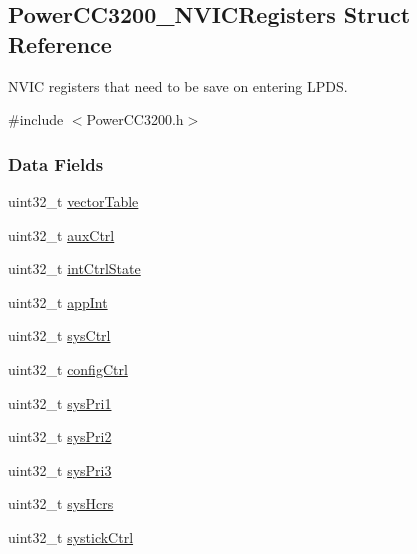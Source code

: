 \subsection{Power\+C\+C3200\+\_\+\+N\+V\+I\+C\+Registers Struct Reference}
\label{struct_power_c_c3200___n_v_i_c_registers}


N\+V\+I\+C registers that need to be save on entering L\+P\+D\+S.  




{\ttfamily \#include $<$Power\+C\+C3200.\+h$>$}

\subsubsection*{Data Fields}
\begin{DoxyCompactItemize}
\item 
uint32\+\_\+t \hyperlink{struct_power_c_c3200___n_v_i_c_registers_a74fc1ecc344c0abca6ec895aae4950c2}{vector\+Table}
\item 
uint32\+\_\+t \hyperlink{struct_power_c_c3200___n_v_i_c_registers_ae496eff43873c94c5848b60affc4053c}{aux\+Ctrl}
\item 
uint32\+\_\+t \hyperlink{struct_power_c_c3200___n_v_i_c_registers_a934e142bb77cb368d3d1a6a85042aac2}{int\+Ctrl\+State}
\item 
uint32\+\_\+t \hyperlink{struct_power_c_c3200___n_v_i_c_registers_aaecf0147c3607a13b31d579ebde8d77c}{app\+Int}
\item 
uint32\+\_\+t \hyperlink{struct_power_c_c3200___n_v_i_c_registers_a7c56160a6a6874fe751a49cf3d699d6b}{sys\+Ctrl}
\item 
uint32\+\_\+t \hyperlink{struct_power_c_c3200___n_v_i_c_registers_af46d1a1ebd426a59c633cecc37b3f255}{config\+Ctrl}
\item 
uint32\+\_\+t \hyperlink{struct_power_c_c3200___n_v_i_c_registers_a66def31675e8a8d9ecfac0c43af72429}{sys\+Pri1}
\item 
uint32\+\_\+t \hyperlink{struct_power_c_c3200___n_v_i_c_registers_acad3d32f1d56b605087b8a776618a467}{sys\+Pri2}
\item 
uint32\+\_\+t \hyperlink{struct_power_c_c3200___n_v_i_c_registers_ab8109885d9058b0e276f73c3264dc930}{sys\+Pri3}
\item 
uint32\+\_\+t \hyperlink{struct_power_c_c3200___n_v_i_c_registers_a00115c291df96fad7f18a0cafd8f6228}{sys\+Hcrs}
\item 
uint32\+\_\+t \hyperlink{struct_power_c_c3200___n_v_i_c_registers_a841a7631b36189be419aeaeccd77186b}{systick\+Ctrl}

\end{DoxyCompactItemize}
